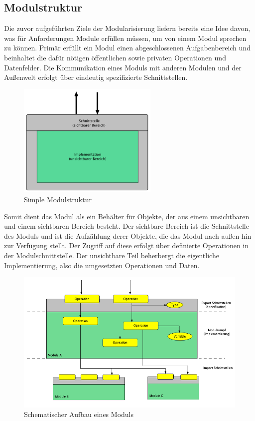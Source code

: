   \subsection{Modulstruktur}
    Die zuvor aufgeführten Ziele der Modularisierung liefern bereits eine Idee davon, was für Anforderungen Module erfüllen müssen, um von einem Modul sprechen zu können. Primär erfüllt ein Modul einen abgeschlossenen Aufgabenbereich und beinhaltet die dafür nötigen öffentlichen sowie privaten Operationen und Datenfelder.
    Die Kommunikation eines Moduls mit anderen Modulen und der Außenwelt erfolgt über eindeutig spezifizierte Schnittstellen.
      \begin{figure}[h!]
        \centering
        \includegraphics[width=0.6\textwidth]{material/images/simple-module.png}
        \caption{Simple Modulstruktur}
        \label{fig:simple-module}
      \end{figure} 
    Somit dient das Modul als ein Behälter für Objekte, der aus einem unsichtbaren und einem sichtbaren Bereich besteht. Der sichtbare Bereich ist die Schnittstelle des Moduls und ist die Aufzählung derer Objekte, die das Modul nach außen hin zur Verfügung stellt. Der Zugriff auf diese erfolgt über definierte Operationen in der Modulschnittstelle. 
    Der unsichtbare Teil beherbergt die eigentliche Implementierung, also die umgesetzten Operationen und Daten. 
      \begin{figure}[h!]
        \centering
        \includegraphics[width=\textwidth]{material/images/module-workflow.png}
        \caption{Schematischer Aufbau eines Moduls}
        \label{fig:module-workflow}
      \end{figure} 
